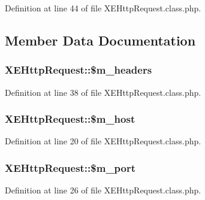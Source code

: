 Definition at line 44 of file X\+E\+Http\+Request.\+class.\+php.



\subsection{Member Data Documentation}
\hypertarget{classXEHttpRequest_a36df236b46af2f09dd9020096dbaed22}{}
\subsubsection[{\$m\+\_\+headers}]{\setlength{\rightskip}{0pt plus 5cm}X\+E\+Http\+Request\+::\$m\+\_\+headers}\label{classXEHttpRequest_a36df236b46af2f09dd9020096dbaed22}


Definition at line 38 of file X\+E\+Http\+Request.\+class.\+php.

\hypertarget{classXEHttpRequest_ad88148dced2b42017a96b2a5dd0b533a}{}
\subsubsection[{\$m\+\_\+host}]{\setlength{\rightskip}{0pt plus 5cm}X\+E\+Http\+Request\+::\$m\+\_\+host}\label{classXEHttpRequest_ad88148dced2b42017a96b2a5dd0b533a}


Definition at line 20 of file X\+E\+Http\+Request.\+class.\+php.

\hypertarget{classXEHttpRequest_a35c62f61b5ad2c200c53a58dd43a2784}{}
\subsubsection[{\$m\+\_\+port}]{\setlength{\rightskip}{0pt plus 5cm}X\+E\+Http\+Request\+::\$m\+\_\+port}\label{classXEHttpRequest_a35c62f61b5ad2c200c53a58dd43a2784}


Definition at line 26 of file X\+E\+Http\+Request.\+class.\+php.

\hypertarget{classXEHttpRequest_a501919f00934ef2cc76300fa32c2f19d}{}
